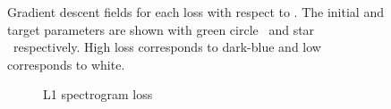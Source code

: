 \begin{figure}[htbp]
    \caption{Gradient descent fields for each loss with respect to \AddSineSaw{}. The initial and target parameters are shown with green circle \greencircle~and star \greenstar~respectively. High loss corresponds to dark-blue and low corresponds to white.}
    \label{fig:p1_losses}
\end{figure}

\begin{figure}[htbp]
    \centering
    \begin{subfigure}[b]{0.49\textwidth}
        \centering
        \caption{L1 spectrogram loss}
        \label{fig:p2_spec}
    \end{subfigure}
    \hfill
    \begin{subfigure}[b]{0.49\textwidth}
        \centering

\end{subfigure}
\end{figure}
